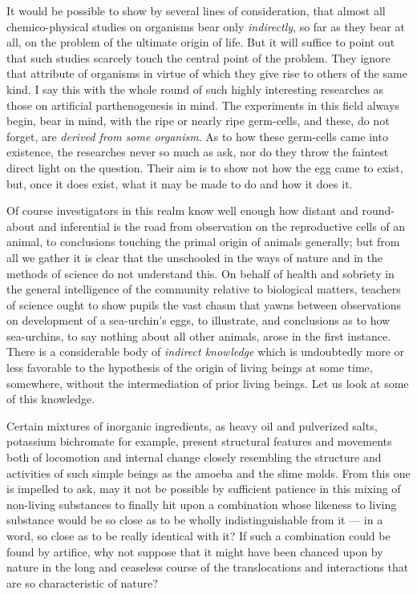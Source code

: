 \documentclass[a4paper, 11pt, oneside, polutonikogreek, english, landscape]{article}
\begin{document}
It would be possible to show by several lines of consideration, that almost all chemico-physical studies on organisms bear only \emph{indirectly}, so far as they bear at all, on the problem of the ultimate origin of life. But it will suffice to point out that such studies scarcely touch the central point of the problem. They ignore that attribute of organisms in virtue of which they give rise to others of the same kind. I say this with the whole round of such highly interesting researches as those on artificial parthenogenesis in mind. The experiments in this field always begin, bear in mind, with the ripe or nearly ripe germ-cells, and these, do not forget, are \emph{derived from some organism}. As to how these germ-cells came into existence, the researches never so much as ask, nor do they throw the faintest direct light on the question. Their aim is to show not how the egg came to exist, but, once it does exist, what it may be made to do and how it does it.

Of course investigators in this realm know well enough how distant and round-about and inferential is the road from observation on the reproductive cells of an animal, to conclusions touching the primal origin of animals generally; but from all we gather it is clear that the unschooled in the ways of nature and in the methods of science do not understand this. On behalf of health and sobriety in the general intelligence of the community relative to biological matters, teachers of science ought to show pupils the vast chasm that yawns between observations on development of a sea-urchin's eggs, to illustrate, and conclusions as to how sea-urchins, to say nothing about all other animals, arose in the first instance. There is a considerable body of \emph{indirect knowledge} which is undoubtedly more or less favorable to the hypothesis of the origin of living beings at some time, somewhere, without the intermediation of prior living beings. Let us look at some of this knowledge.

Certain mixtures of inorganic ingredients, as heavy oil and pulverized salts, potassium bichromate for example, present structural features and movements both of locomotion and internal change closely resembling the structure and activities of such simple beings as the amoeba and the slime molds. From this one is impelled to ask, may it not be possible by sufficient patience in this mixing of non-living substances to finally hit upon a combination whose likeness to living substance would be so close as to be wholly indistinguishable from it --- in a word, so close as to be really identical with it? If such a combination could be found by artifice, why not suppose that it might have been chanced upon by nature in the long and ceaseless course of the translocations and interactions that are so characteristic of nature?
\end{document}

